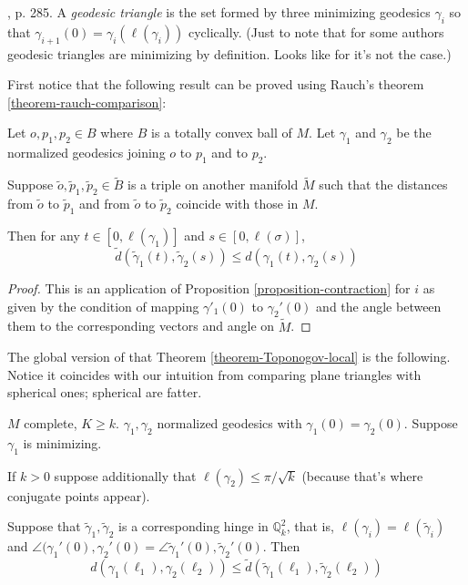 \begin{definition}
\label{definition-geodesic-triangle}
\cite{doc}, p. 285. A {\it geodesic triangle}
is the set formed by three
minimizing geodesics $\gamma_i$ so that
$\gamma_{i+1}(0)=\gamma_i(\ell(\gamma_i))$
cyclically. (Just to note that for
some authors geodesic triangles are
minimizing by definition. Looks like for
\cite{meyers} it's not the case.)
\end{definition}

First notice that the following result can be
proved using Rauch's theorem
\ref{theorem-rauch-comparison}:

\begin{theorem}
\label{theorem-Toponogov-local}
Let $o,p_1,p_2 \in B$ where $B$ is a totally
convex ball of $M$. Let $\gamma_1$
and $\gamma_2$ be the normalized geodesics
joining $o$ to $p_1$ and to $p_2$.

Suppose $\tilde{o}, \tilde{p}_1,\tilde{p}_2
\in \tilde{B}$ is a triple on
another manifold $\tilde{M}$ such that the
distances from $\tilde{o}$ to
$\tilde{p}_1$ and from $\tilde{o}$ to
$\tilde{p}_2$ coincide with those in $M$.

Then for any $t \in [0,\ell(\gamma_1)]$ and
$s \in [0,\ell(\sigma)]$,
$$
\tilde{d}(\tilde{\gamma}_1(t),\tilde{\gamma}
_2(s))\leq
d(\gamma_1(t),\gamma_2(s))
$$
\end{theorem}

\begin{proof}
This is an application of Proposition
\ref{proposition-contraction} for $i$ as
given by the condition of mapping
$\gamma'_1(0)$ to $\gamma_2'(0)$ and the
angle
between them to the corresponding vectors and
angle on $\tilde{M}$.
\end{proof}

The global version of that Theorem
\ref{theorem-Toponogov-local} is the
following. Notice it coincides with our
intuition from comparing plane triangles
with spherical ones; spherical are fatter.

\begin{theorem}
\label{theorem-Toponogov-hinge}
$M$ complete, $K \geq k$. $\gamma_1,\gamma_2$
normalized geodesics with
$\gamma_1(0)=\gamma_2(0)$. Suppose $\gamma_1$
is minimizing.

If $k>0$ suppose additionally that
$\ell(\gamma_2) \leq \pi/\sqrt{k}$ (because
that's where conjugate points appear).

Suppose that
$\tilde{\gamma}_1,\tilde{\gamma}_2$ is a
corresponding hinge in
$\mathbb{Q}_k^2$, that is,
$\ell(\gamma_i)=\ell(\tilde{\gamma}_i)$ and
$\angle(\gamma_1'(0),\gamma_2'(0)=
\angle\tilde{\gamma}_1'(0),\tilde{\gamma}
_2'(0)$.
Then
\begin{equation}
\label{equation-Toponogov-hinge1}
d(\gamma_1(\ell_1),\gamma_2(\ell_2)) \leq
\tilde{d}(\tilde{\gamma}_1(\ell_1),
\tilde{\gamma}_2(\ell_2))
\end{equation}
\end{theorem}

